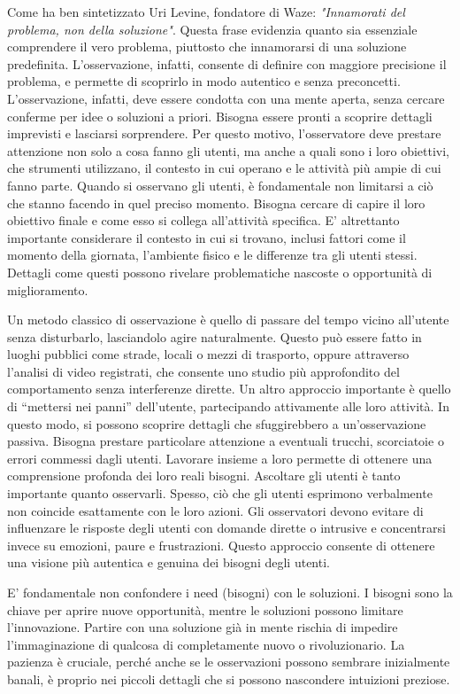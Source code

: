 Come ha ben sintetizzato Uri Levine, fondatore di Waze: \textit{"Innamorati del problema, non della soluzione"}. Questa frase evidenzia quanto sia essenziale comprendere il vero problema, piuttosto che innamorarsi di una soluzione predefinita. L’osservazione, infatti, consente di definire con maggiore precisione il problema, e permette di scoprirlo in modo autentico e senza preconcetti.
L'osservazione, infatti, deve essere condotta con una mente aperta, senza cercare conferme per idee o soluzioni a priori. Bisogna essere pronti a scoprire dettagli imprevisti e lasciarsi sorprendere. Per questo motivo, l’osservatore deve prestare attenzione non solo a cosa fanno gli utenti, ma anche a quali sono i loro obiettivi, che strumenti utilizzano, il contesto in cui operano e le attività più ampie di cui fanno parte.
Quando si osservano gli utenti, è fondamentale non limitarsi a ciò che stanno facendo in quel preciso momento. Bisogna cercare di capire il loro obiettivo finale e come esso si collega all’attività specifica. E' altrettanto importante considerare il contesto in cui si trovano, inclusi fattori come il momento della giornata, l’ambiente fisico e le differenze tra gli utenti stessi. Dettagli come questi possono rivelare problematiche nascoste o opportunità di miglioramento.

Un metodo classico di osservazione è quello di passare del tempo vicino all’utente senza disturbarlo, lasciandolo agire naturalmente. Questo può essere fatto in luoghi pubblici come strade, locali o mezzi di trasporto, oppure attraverso l’analisi di video registrati, che consente uno studio più approfondito del comportamento senza interferenze dirette.
Un altro approccio importante è quello di “mettersi nei panni” dell'utente, partecipando attivamente alle loro attività. In questo modo, si possono scoprire dettagli che sfuggirebbero a un’osservazione passiva. Bisogna prestare particolare attenzione a eventuali trucchi, scorciatoie o errori commessi dagli utenti. Lavorare insieme a loro permette di ottenere una comprensione profonda dei loro reali bisogni.
Ascoltare gli utenti è tanto importante quanto osservarli. Spesso, ciò che gli utenti esprimono verbalmente non coincide esattamente con le loro azioni. Gli osservatori devono evitare di influenzare le risposte degli utenti con domande dirette o intrusive e concentrarsi invece su emozioni, paure e frustrazioni. Questo approccio consente di ottenere una visione più autentica e genuina dei bisogni degli utenti.

E' fondamentale non confondere i need (bisogni) con le soluzioni. I bisogni sono la chiave per aprire nuove opportunità, mentre le soluzioni possono limitare l’innovazione. Partire con una soluzione già in mente rischia di impedire l’immaginazione di qualcosa di completamente nuovo o rivoluzionario. La pazienza è cruciale, perché anche se le osservazioni possono sembrare inizialmente banali, è proprio nei piccoli dettagli che si possono nascondere intuizioni preziose.


